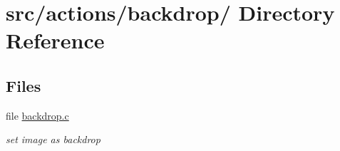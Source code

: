 \hypertarget{dir_000011}{
\section{src/actions/backdrop/ Directory Reference}
\label{dir_000011}
}
\subsection*{Files}
\begin{CompactItemize}
\item 
file \hyperlink{backdrop_8c}{backdrop.c}
\begin{CompactList}\small\item\em set image as backdrop \item\end{CompactList}

\end{CompactItemize}
